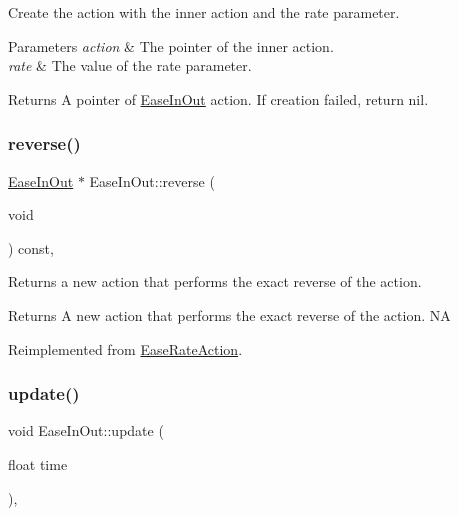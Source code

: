 Create the action with the inner action and the rate parameter. 


\begin{DoxyParams}{Parameters}
{\em action} & The pointer of the inner action. \\
\hline
{\em rate} & The value of the rate parameter. \\
\hline
\end{DoxyParams}
\begin{DoxyReturn}{Returns}
A pointer of \hyperlink{classEaseInOut}{Ease\+In\+Out} action. If creation failed, return nil. 
\end{DoxyReturn}
\mbox{\label{classEaseInOut_ab11193be98284ab001e120888b92803f}} 
\subsubsection{\texorpdfstring{reverse()}{reverse()}}
{\footnotesize\ttfamily \hyperlink{classEaseInOut}{Ease\+In\+Out} $\ast$ Ease\+In\+Out\+::reverse (\begin{DoxyParamCaption}\item[{void}]{ }\end{DoxyParamCaption}) const\hspace{0.3cm}{\ttfamily [override]}, {\ttfamily [virtual]}}

Returns a new action that performs the exact reverse of the action.

\begin{DoxyReturn}{Returns}
A new action that performs the exact reverse of the action.  NA 
\end{DoxyReturn}


Reimplemented from \hyperlink{classEaseRateAction_acd2b87a3358e01fa74a726634dcd41fb}{Ease\+Rate\+Action}.

\mbox{\label{classEaseInOut_ac0e5f3d973cdc7b7d83cc73774ae0321}} 
\subsubsection{\texorpdfstring{update()}{update()}}
{\footnotesize\ttfamily void Ease\+In\+Out\+::update (\begin{DoxyParamCaption}\item[{float}]{time }\end{DoxyParamCaption})\hspace{0.3cm}{\ttfamily [override]}, {\ttfamily [virtual]}}

